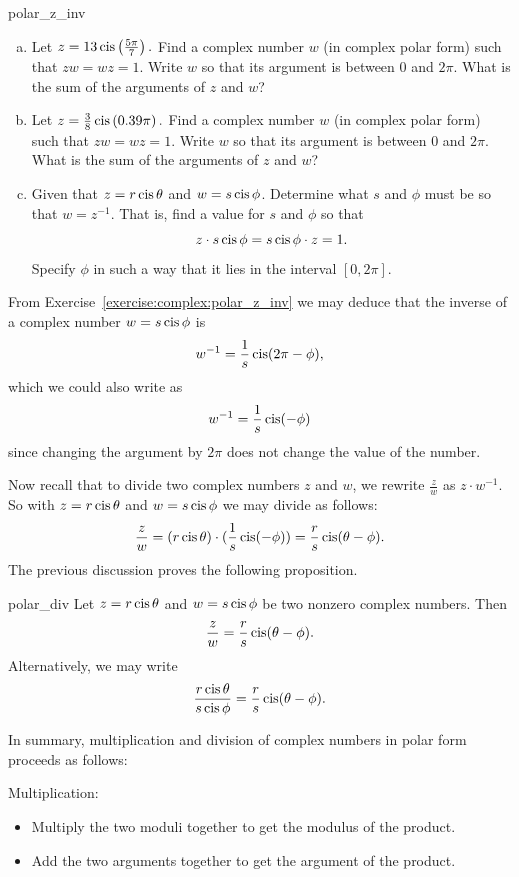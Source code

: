 \begin{exercise}{polar_z_inv}
\begin{enumerate}[(a)]
\item
Let $z = 13 \operatorname{cis}\left(\frac{5\pi}{7}\right).$ Find a complex number $w$ (in complex polar form) such that $zw = wz = 1$. Write $w$ so that its argument is between $0$ and $2\pi$. What is the sum of the arguments of $z$ and $w$?
\item
Let $z = \frac{3}{8} \operatorname{cis}\left(0.39\pi\right).$ Find a complex number $w$ (in complex polar form) such that $zw = wz = 1$. Write $w$ so that its argument is between $0$ and $2\pi$. What is the sum of the arguments of $z$ and $w$?
\item
Given that $z=r\operatorname{cis}\theta$ and $w=s\operatorname{cis}\phi$.  Determine what $s$ and $\phi$ must be so that $w = z^{-1}$.  That is, find a value for $s$ and $\phi$ so that 
\[ z \cdot s\operatorname{cis}\phi = s\operatorname{cis}\phi \cdot z = 1.\]
Specify $\phi$ in such a way that it lies in the interval $[0,2\pi]$.
\end{enumerate}
\end{exercise}


\medskip{}
\noindent
From Exercise~\ref{exercise:complex:polar_z_inv} we may deduce that the inverse of a complex number $w = s \operatorname{cis} \phi$ is
\[ w^{-1} = \frac{1}{s}\operatorname{cis}(2\pi -\phi), \]
which we could also write as
\[ w^{-1} = \frac{1}{s}\operatorname{cis}(-\phi) \]
since changing the argument by $2\pi$ does not change the value of the number.

Now recall that to divide two complex numbers $z$ and $w$, we rewrite $\frac{z}{w}$ as $z \cdot w^{-1}$.  
So with $z=r\operatorname{cis}\theta$ and $w=s\operatorname{cis}\phi$ we may divide as follows:  
\[ \frac{z}{w} = (r\operatorname{cis}\theta) \cdot (\frac{1}{s}\operatorname{cis}(-\phi)) = \frac{r}{s}\operatorname{cis}(\theta - \phi). \]
The previous discussion proves the following proposition.

\begin{prop}{polar_div}
Let $z=r\operatorname{cis}\theta$ and $w=s\operatorname{cis}\phi$ be two nonzero complex numbers. Then
 \[ \frac{z}{w} = \frac{r}{s}\operatorname{cis}(\theta - \phi).\]
 Alternatively, we may write
 \[ \frac{r \operatorname{cis} \theta}{s \operatorname{cis} \phi} = \frac{r}{s}\operatorname{cis}(\theta - \phi).\]
 \end{prop}

\noindent
In summary, multiplication and division of complex numbers in polar form proceeds as follows:

\medskip{}
\noindent
Multiplication:
\begin{itemize}
\item
Multiply the two moduli together to get the modulus of the product.
\item
Add the two arguments together to get the argument of the product.
\end{itemize}


